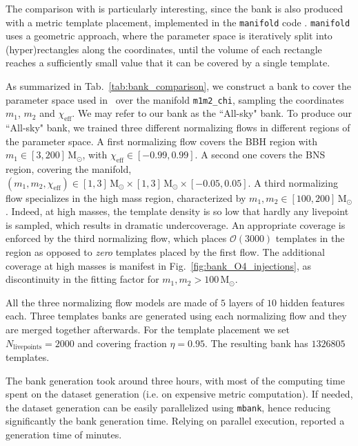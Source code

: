 \documentclass[twocolumn,showpacs,preprintnumbers,nofootinbib,prd,
superscriptaddress,10pt]{revtex4-2}
\begin{document}
The comparison with \cite{Sakon:2022ibh} is particularly interesting, since the bank is also produced with a metric template placement, implemented in the \texttt{manifold} code \cite{Hanna:2022zpk}. \texttt{manifold} uses a geometric approach, where the parameter space is iteratively split into (hyper)rectangles along the coordinates, until the volume of each rectangle reaches a sufficiently small value that it can be covered by a single template.

As summarized in Tab.~\ref{tab:bank_comparison}, we construct a bank to cover the parameter space used in~\cite{Sakon:2022ibh} over the manifold \texttt{m1m2\_chi}, sampling the coordinates $m_1$, $m_2$ and $\chi_\text{eff}$. We may refer to our bank as the ``All-sky" bank.
To produce our ``All-sky" bank, we trained three different normalizing flows in different regions of the parameter space. A first normalizing flow covers the BBH region with $m_1 \in [3,200]\,\mathrm{M_\odot}$, with $\chi_\text{eff} \in [-0.99, 0.99]$. A second one covers the BNS region, covering the manifold, ${(m_1, m_2, \chi_\text{eff}) \in [1,3]\,\mathrm{M_\odot}\times[1,3]\,\mathrm{M_\odot}\times [-0.05, 0.05]}$.
A third normalizing flow specializes in the high mass region, characterized by $m_1, m_2 \in [100,200]\,\mathrm{M_\odot}$.
Indeed, at high masses, the template density is so low that hardly any livepoint is sampled, which results in dramatic undercoverage. An appropriate coverage is enforced by the third normalizing flow, which places $\mathcal{O}(3000)$ templates in the region as opposed to {\it zero} templates placed by the first flow.
The additional coverage at high masses is manifest in Fig.~\ref{fig:bank_O4_injections}, as discontinuity in the fitting factor for ${m_1,m_2>100\,\mathrm{M_\odot}}$.

All the three normalizing flow models are made of $5$ layers of $10$ hidden features each.
Three templates banks are generated using each normalizing flow and they are merged together afterwards.
For the template placement we set $N_\text{livepoints} = 2000$ and covering fraction $\eta = 0.95$.
The resulting bank has $1326805$ templates.

The bank generation took around three hours, with most of the computing time spent on the dataset generation (i.e. on expensive metric computation). If needed, the dataset generation can be easily parallelized using \texttt{mbank}, hence reducing significantly the bank generation time.
Relying on parallel execution, \cite{Sakon:2022ibh} reported a generation time of minutes.
\end{document}
